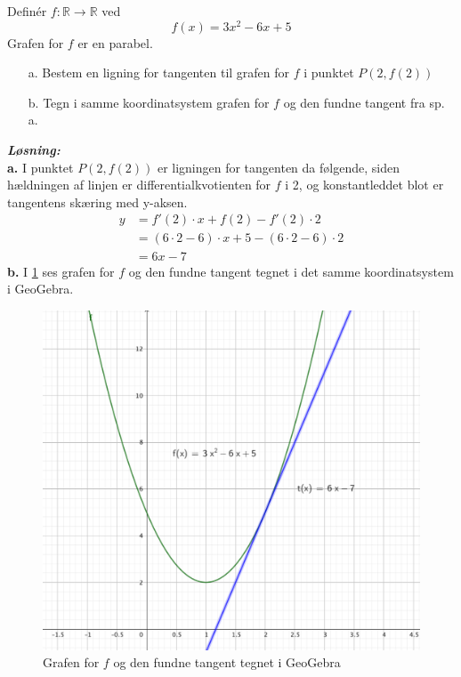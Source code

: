 \documentclass{article}
\newcommand{\sol}{\setlength{\parindent}{0cm}\textbf{\textit{Løsning:}}\setlength{\parindent}{1cm}}
\begin{document}
\begin{question}{}{}
Definér $f:\mathbb{R} \to \mathbb{R}$ ved 
\[
  f(x)=3x^2-6x+5
\] 
Grafen for $f$ er en parabel. 
\begin{itemize}
  \item[a.] Bestem en ligning for tangenten til grafen for $f$ i punktet $P\left(2,f(2)\right)$ 
  \item[b.] Tegn i samme koordinatsystem grafen for $f$ og den fundne tangent fra sp. a.
\end{itemize}
\end{question}
\sol \\ 
\textbf{a.} I punktet $P\left(2,f(2)\right)$ er ligningen for tangenten da følgende, siden hældningen af linjen er differentialkvotienten for $f$  i 2, og konstantleddet blot er tangentens skæring med y-aksen.
\begin{equation*}
\begin{split}
  y&=f'(2)\cdot x + f(2) - f'(2)\cdot 2\\
  &= (6\cdot 2-6)\cdot x+5-(6\cdot 2-6)\cdot 2\\ 
  &=6x-7
\end{split}
\end{equation*}
\textbf{b.} I \cref{fig:4} ses grafen for $f$ og den fundne tangent tegnet i det samme koordinatsystem i GeoGebra.
\begin{figure}[h]
\begin{center}
  \includegraphics[scale=0.5]{Mat16_4.png}
\end{center}
\caption{Grafen for $f$ og den fundne tangent tegnet i GeoGebra }
\label{fig:4}
\end{figure}
\end{document}
